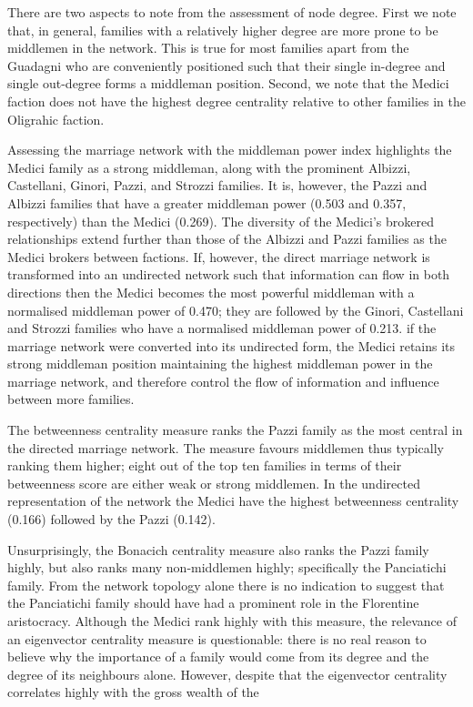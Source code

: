 There are two aspects to note from the assessment of node degree. First we note that, in general, families with a relatively higher degree are more prone to be middlemen in the network. This is true for most families apart from the Guadagni who are conveniently positioned such that their single in-degree and single out-degree forms a middleman position. Second, we note that the Medici faction does not have the highest degree centrality relative to other families in the Oligrahic faction.

Assessing the marriage network with the middleman power index highlights the Medici family as a strong middleman, along with the prominent Albizzi, Castellani, Ginori, Pazzi, and Strozzi families. It is, however, the Pazzi and Albizzi families that have a greater middleman power (0.503 and 0.357, respectively) than the Medici (0.269). The diversity of the Medici's brokered relationships extend further than those of the Albizzi and Pazzi families as the Medici brokers between factions. If, however, the direct marriage network is transformed into an undirected network such that information can flow in both directions then the Medici becomes the most powerful middleman with a normalised middleman power of 0.470; they are followed by the Ginori, Castellani and Strozzi families who have a normalised middleman power of 0.213. if the marriage network were converted into its undirected form, the Medici retains its strong middleman position maintaining the highest middleman power in the marriage network, and therefore control the flow of information and influence between more families.

The betweenness centrality measure ranks the Pazzi family as the most central in the directed marriage network. The measure favours middlemen thus typically ranking them higher; eight out of the top ten families in terms of their betweenness score are either weak or strong middlemen. In the undirected representation of the network the Medici have the highest betweenness centrality (0.166) followed by the Pazzi (0.142).

Unsurprisingly, the Bonacich centrality measure also ranks the Pazzi family highly, but also ranks many non-middlemen highly; specifically the Panciatichi family. From the network topology alone there is no indication to suggest that the Panciatichi family should have had a prominent role in the Florentine aristocracy. Although the Medici rank highly with this measure, the relevance of an eigenvector centrality measure is questionable: there is no real reason to believe why the importance of a family would come from its degree and the degree of its neighbours alone. However, despite that the eigenvector centrality correlates highly with the gross wealth of the 

